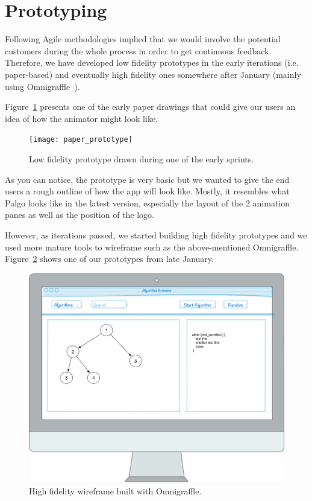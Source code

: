 \documentclass{l4proj}
\begin{document}
\section{Prototyping}

Following Agile methodologies implied that we would involve the potential customers during the whole process in order
to get continuous feedback. Therefore, we have developed low fidelity prototypes in the early iterations (i.e.
paper-based) and eventually high fidelity ones somewhere after January (mainly using Omnigraffle~\cite{omnigraffle}).

Figure~\ref{fig:paper_prototype} presents one of the early paper drawings that could give our users an idea of how the animator might look
like.

\begin{figure}[!ht]
    \centering
    \texttt{[image: paper\_prototype]}
    \caption{Low fidelity prototype drawn during one of the early sprints.}
    \label{fig:paper_prototype}
\end{figure}

As you can notice, the prototype is very basic but we wanted to give the end users a rough outline of how the app will
look like. Mostly, it resembles what Palgo looks like in the latest version, especially the layout of the 2 animation
panes as well as the position of the logo.

However, as iterations passed, we started building high fidelity prototypes and we used more mature tools to wireframe
such as the above-mentioned Omnigraffle. Figure~\ref{fig:high_fidelity_prototype} shows one of our prototypes from
late January.

\begin{figure}[!ht]
    \centering
    \includegraphics[scale=0.3]{high_fidelity_prototype}
    \caption{High fidelity wireframe built with Omnigraffle.}
    \label{fig:high_fidelity_prototype}
\end{figure}
\end{document}
